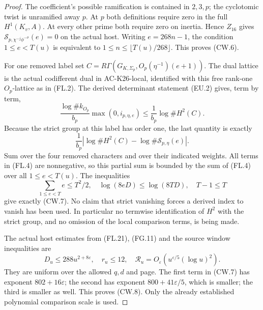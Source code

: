 \begin{proof}
The coefficient's possible ramification is contained in $2,3,p$;
the cyclotomic twist is unramified away $p$.  At $p$ both definitions
require zero in the full $H^1(K_v,A)$.  At every other prime both
require zero on inertia.  Hence $Z_{16}$ gives
$\mathcal S_{p,\chi^{-j}\phi^{-\sigma}}(e)=0$ on the actual host.
Writing $e=268n-1$, the condition $1\leq e<T(u)$ is equivalent to
$1\leq n\leq\lfloor T(u)/268\rfloor$.  This proves (CW.6).

For one removed label set
$C=R\Gamma(G_{K,\Sigma_p},O_p(\eta^{-1})(e+1))$.
The dual lattice is the actual codifferent dual in AC-K26-local,
identified with this free rank-one $O_p$-lattice as in (FL.2).
The derived determinant statement (EU.2) gives, term by term,
\[
 \frac{\log\#k_{O_p}}{b_p}\max(0,i_{p,\eta,e})
       \leq \frac1{b_p}\log\#H^2(C).
 \tag{CW.10}
\]
Because the strict group at this label has order one, the last
quantity is exactly
\[
 \frac1{b_p}\left|\log\#H^2(C)
                   -\log\#\mathcal S_{p,\eta}(e)\right|.
 \tag{CW.11}
\]
Sum over the four removed characters and over their indicated
weights.  All terms in (FL.4) are nonnegative, so this partial sum
is bounded by the sum of (FL.4) over all $1\leq e<T(u)$.
The inequalities
\[
 \sum_{1\leq e<T}e\leq T^2/2,\quad
 \log(8eD)\leq\log(8TD),\quad T-1\leq T
\]
give exactly (CW.7).  No claim that strict vanishing forces a
derived index to vanish has been used.  In particular no termwise
identification of $H^2$ with the strict group, and no omission of
the local comparison terms, is being made.

The actual host estimates from (FL.21), (FG.11) and the source
window inequalities are
\[
 D_u\leq288u^{2+8\varepsilon},\quad r_u\leq12,\quad
 \mathcal R_u=O_\varepsilon(u^{\varepsilon/5}(\log u)^2).
 \tag{CW.12}
\]
They are uniform over the allowed $q,d$ and page.
The first term in (CW.7) has exponent $802+16\varepsilon$;
the second has exponent $800+41\varepsilon/5$, which is smaller;
the third is smaller as well.  This proves (CW.8).
Only the already established polynomial comparison scale is used.


\end{proof}
